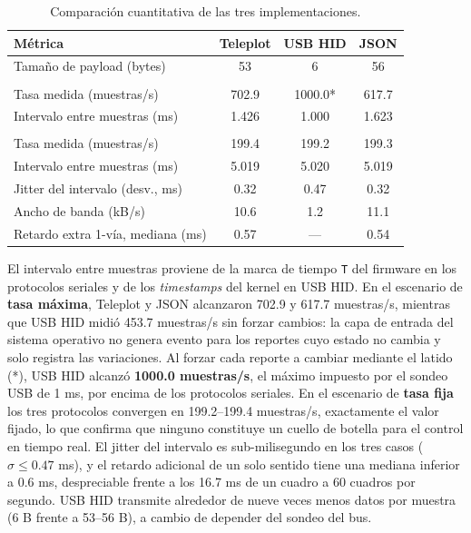 \documentclass[journal]{IEEEtran}
\begin{document}
\begin{table}[htbp]
    \centering
    \caption{Comparación cuantitativa de las tres implementaciones.}
    \label{tab:cuantitativa}
    \scriptsize
    \begin{tabular}{@{}>{\raggedright\arraybackslash}p{3.0cm}ccc@{}}
        \toprule
        \textbf{Métrica} & \textbf{Teleplot} & \textbf{USB HID} & \textbf{JSON} \\
        \midrule
        Tamaño de payload (bytes) & 53 & 6 & 56 \\
        \midrule
        \multicolumn{4}{@{}l}{\textit{Tasa máxima (envío continuo)}} \\
        Tasa medida (muestras/s) & 702.9 & 1000.0* & 617.7 \\
        Intervalo entre muestras (ms) & 1.426 & 1.000 & 1.623 \\
        \midrule
        \multicolumn{4}{@{}l}{\textit{Tasa fija (200 muestras/s)}} \\
        Tasa medida (muestras/s) & 199.4 & 199.2 & 199.3 \\
        Intervalo entre muestras (ms) & 5.019 & 5.020 & 5.019 \\
        Jitter del intervalo (desv., ms) & 0.32 & 0.47 & 0.32 \\
        Ancho de banda (kB/s) & 10.6 & 1.2 & 11.1 \\
        Retardo extra 1-vía, mediana (ms) & 0.57 & --- & 0.54 \\
        \bottomrule
    \end{tabular}
\end{table}

El intervalo entre muestras proviene de la marca de tiempo \texttt{T} del firmware en los protocolos seriales y de los \textit{timestamps} del kernel en USB HID. En el escenario de \textbf{tasa máxima}, Teleplot y JSON alcanzaron 702.9 y 617.7 muestras/s, mientras que USB HID midió 453.7 muestras/s sin forzar cambios: la capa de entrada del sistema operativo no genera evento para los reportes cuyo estado no cambia y solo registra las variaciones. Al forzar cada reporte a cambiar mediante el latido (*), USB HID alcanzó \textbf{1000.0 muestras/s}, el máximo impuesto por el sondeo USB de 1 ms, por encima de los protocolos seriales. En el escenario de \textbf{tasa fija} los tres protocolos convergen en 199.2--199.4 muestras/s, exactamente el valor fijado, lo que confirma que ninguno constituye un cuello de botella para el control en tiempo real. El jitter del intervalo es sub-milisegundo en los tres casos ($\sigma \le 0.47$ ms), y el retardo adicional de un solo sentido tiene una mediana inferior a 0.6 ms, despreciable frente a los 16.7 ms de un cuadro a 60 cuadros por segundo. USB HID transmite alrededor de nueve veces menos datos por muestra (6 B frente a 53--56 B), a cambio de depender del sondeo del bus.
\end{document}

